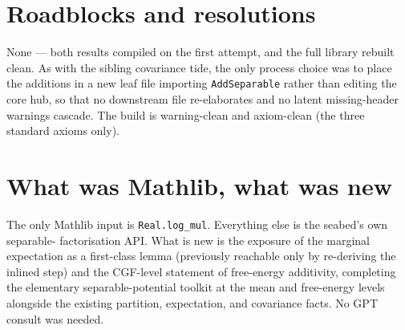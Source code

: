 \documentclass[11pt]{article}
\begin{document}
\section{Roadblocks and resolutions}
None --- both results compiled on the first attempt, and the full library rebuilt clean. As with the
sibling covariance tide, the only process choice was to place the additions in a new leaf file
importing \texttt{AddSeparable} rather than editing the core hub, so that no downstream file
re-elaborates and no latent missing-header warnings cascade. The build is warning-clean and
axiom-clean (the three standard axioms only).

\section{What was Mathlib, what was new}
The only Mathlib input is \texttt{Real.log\_mul}. Everything else is the seabed's own separable-%
factorisation API. What is new is the exposure of the marginal expectation as a first-class lemma
(previously reachable only by re-deriving the inlined step) and the CGF-level statement of free-energy
additivity, completing the elementary separable-potential toolkit at the mean and free-energy levels
alongside the existing partition, expectation, and covariance facts. No GPT consult was needed.
\end{document}

